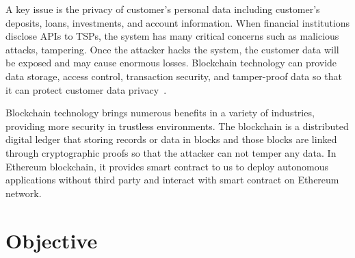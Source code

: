 A key issue is the privacy of customer's personal data including customer's deposits, loans, investments, and account information. When financial institutions disclose APIs to TSPs, the system has many critical concerns such as malicious attacks, tampering. Once the attacker hacks the system, the customer data will be exposed and may cause enormous losses. Blockchain technology can provide data storage, access control, transaction security, and tamper-proof data so that it can protect customer data privacy~\cite{wang2020blockchain}.\par
Blockchain technology brings numerous benefits in a variety of industries, providing more security in trustless environments. The blockchain is a distributed digital ledger that storing records or data in blocks and those blocks are linked through cryptographic proofs so that the attacker can not temper any data. In Ethereum blockchain, it provides smart contract to us to deploy autonomous applications without third party and interact with smart contract on Ethereum network.\par

\section{Objective}

